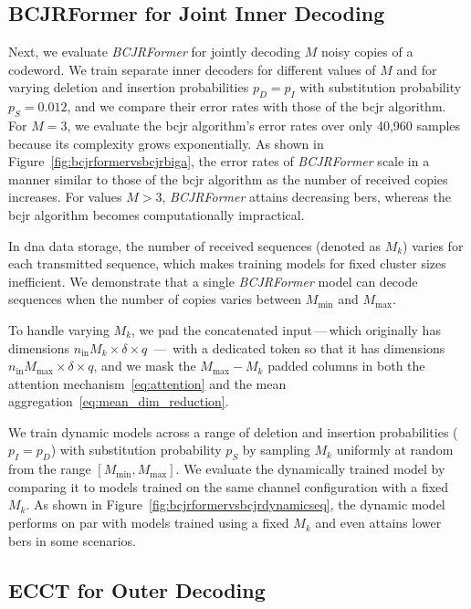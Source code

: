\documentclass[conference,letterpaperu]{IEEEtran}
\newcommand{\pdel}{\ensuremath{p_D}}
\newcommand{\pins}{\ensuremath{p_I}}
\newcommand{\psub}{\ensuremath{p_S}}
\newcommand{\nin}{\ensuremath{n_{\text{in}}}}
\begin{document}
\subsection{BCJRFormer for Joint Inner Decoding}
Next, we evaluate \textit{BCJRFormer} for jointly decoding \(M\) noisy copies of a codeword. We train separate inner decoders for different values of \(M\) and for varying deletion and insertion probabilities \(\pdel = \pins\) with substitution probability \(\psub = 0.012\), and we compare their error rates with those of the \ac{bcjr} algorithm. For \(M = 3\), we evaluate the \ac{bcjr} algorithm's error rates over only 40{,}960 samples because its complexity grows exponentially. As shown in Figure~\ref{fig:bcjrformervsbcjrbiga}, the error rates of \textit{BCJRFormer} scale in a manner similar to those of the \ac{bcjr} algorithm as the number of received copies increases. For values \(M > 3\), \textit{BCJRFormer} attains decreasing \acp{ber}, whereas the \ac{bcjr} algorithm becomes computationally impractical.

In \ac{dna} data storage, the number of received sequences (denoted as \(M_k\)) varies for each transmitted sequence, which makes training models for fixed cluster sizes inefficient. We demonstrate that a single \textit{BCJRFormer} model can decode sequences when the number of copies varies between $M_{\min}$ and $M_{\max}$. 

To handle varying \(M_k\), we pad the concatenated input\,---\,which originally has dimensions $\nin M_k \times \delta \times q$ \,---\, with a dedicated token so that it has dimensions \(\nin M_{\max} \times \delta \times q\), and we mask the \(M_{\max} - M_k\) padded columns in both the attention mechanism~\eqref{eq:attention} and the mean aggregation~\eqref{eq:mean_dim_reduction}. 

We train dynamic models across a range of deletion and insertion probabilities ($\pins = \pdel$) with substitution probability $\psub$ by sampling $M_k$ uniformly at random from the range $[M_{\min}, M_{\max}]$. We evaluate the dynamically trained model by comparing it to models trained on the same channel configuration with a fixed \(M_k\). As shown in Figure~\ref{fig:bcjrformervsbcjrdynamicseq}, the dynamic model performs on par with models trained using a fixed $M_k$ and even attains lower \acp{ber} in some scenarios.


\subsection{ECCT for Outer Decoding}
\end{document}
